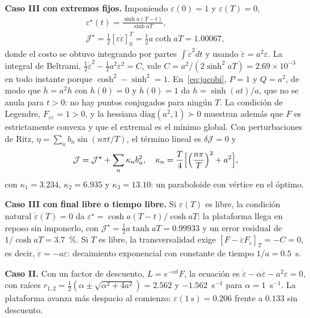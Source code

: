 \documentclass[conference]{IEEEtran}
\begin{document}
\textbf{Caso III con extremos fijos.} Imponiendo $\varepsilon(0) = 1$ y $\varepsilon(T) = 0$,
\begin{gather}
\varepsilon^\star(t) = \frac{\sinh a(T - t)}{\sinh aT}, \label{eq:fijos}\\
\mathcal J^\star = \tfrac12[\varepsilon\dot\varepsilon]_0^T = \tfrac12a\coth aT = 1.00067 ,\nonumber
\end{gather}
donde el costo se obtuvo integrando por partes $\int\dot\varepsilon^2dt$ y usando $\ddot\varepsilon = a^2\varepsilon$. La integral de Beltrami, $\frac12\dot\varepsilon^2 - \frac12a^2\varepsilon^2 = C$, vale $C = a^2/(2\sinh^2aT) = 2.69\times10^{-3}$ en todo instante porque $\cosh^2 - \sinh^2 = 1$. En~\eqref{eq:jacobi}, $P = 1$ y $Q = a^2$, de modo que $\ddot h = a^2h$ con $h(0) = 0$ y $\dot h(0) = 1$ da $h = \sinh(at)/a$, que no se anula para $t > 0$: no hay puntos conjugados para ningún $T$. La condición de Legendre, $F_{\dot\varepsilon\dot\varepsilon} = 1 > 0$, y la hessiana $\mathrm{diag}(a^2, 1) \succ 0$ muestran además que $F$ es estrictamente convexa y que el extremal es el mínimo global. Con perturbaciones de Ritz, $\eta = \sum_nb_n\sin(n\pi t/T)$, el término lineal es $\delta\mathcal J = 0$ y
\begin{equation}
\mathcal J = \mathcal J^\star + \sum_n\kappa_nb_n^2,\quad \kappa_n = \frac{T}{4}\Bigl[\Bigl(\frac{n\pi}{T}\Bigr)^2 + a^2\Bigr],
\end{equation}
con $\kappa_1 = 3.234$, $\kappa_2 = 6.935$ y $\kappa_3 = 13.10$: un paraboloide con vértice en el óptimo.

\textbf{Caso III con final libre o tiempo libre.} Si $\varepsilon(T)$ es libre, la condición natural $\dot\varepsilon(T) = 0$ da $\varepsilon^\star = \cosh a(T - t)/\cosh aT$: la plataforma llega en reposo sin imponerlo, con $\mathcal J^\star = \frac12a\tanh aT = 0.99933$ y un error residual de $1/\cosh aT = 3.7$~\%. Si $T$ es libre, la transversalidad exige $[F - \dot\varepsilon F_{\dot\varepsilon}]_T = -C = 0$, es decir, $\dot\varepsilon = -a\varepsilon$: decaimiento exponencial con constante de tiempo $1/a = 0.5$~s.

\textbf{Caso II.} Con un factor de descuento, $L = e^{-\alpha t}F$, la ecuación es $\ddot\varepsilon - \alpha\dot\varepsilon - a^2\varepsilon = 0$, con raíces $r_{1,2} = \frac12(\alpha\pm\sqrt{\alpha^2 + 4a^2}) = 2.562$ y $-1.562$~s$^{-1}$ para $\alpha = 1$~s$^{-1}$. La plataforma avanza más despacio al comienzo: $\varepsilon(1\ \text{s}) = 0.206$ frente a $0.133$ sin descuento.
\end{document}
